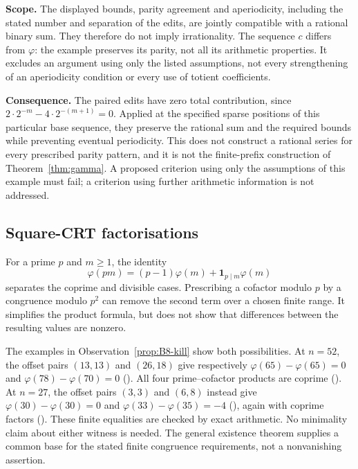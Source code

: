 \textbf{Scope.} The displayed bounds, parity agreement and
aperiodicity, including the stated number and separation of the edits,
are jointly compatible with a rational binary sum. They therefore do not
imply irrationality. The sequence $c$ differs from $\varphi$: the example
preserves its parity, not all its arithmetic properties. It excludes an
argument using only the listed assumptions, not every strengthening of
an aperiodicity condition or every use of totient coefficients.

\textbf{Consequence.} The paired edits have zero total contribution,
since $2\cdot2^{-m}-4\cdot2^{-(m+1)}=0$. Applied at the specified sparse
positions of this particular base sequence, they preserve the rational
sum and the required bounds while preventing eventual periodicity. This
does not construct a rational series for every prescribed parity pattern,
and it is not the finite-prefix construction of Theorem~\ref{thm:gamma}.
A proposed criterion using only the assumptions of this example must fail;
a criterion using further arithmetic information is not addressed.


\subsection{Square-CRT factorisations}

For a prime $p$ and $m\ge1$, the identity
\[
 \varphi(pm)=(p-1)\varphi(m)+\mathbf1_{p\mid m}\varphi(m)
\]
separates the coprime and divisible cases. Prescribing a cofactor
modulo $p$ by a congruence modulo $p^2$ can remove the second term
over a chosen finite range. It simplifies the product formula, but
does not show that differences between the resulting values are nonzero.

The examples in Observation~\ref{prop:B8-kill} show both possibilities.
At $n=52$, the offset pairs $(13,13)$ and $(26,18)$ give respectively
$\varphi(65)-\varphi(65)=0$ and
$\varphi(78)-\varphi(70)=0$
().
All four prime--cofactor products are coprime
().
At $n=27$, the offset pairs $(3,3)$ and $(6,8)$ instead give
$\varphi(30)-\varphi(30)=0$ and
$\varphi(33)-\varphi(35)=-4$
(),
again with coprime factors
().
These finite equalities are checked by exact arithmetic. No minimality
claim about either witness is needed. The general existence theorem
supplies a common base for the stated finite congruence requirements,
not a nonvanishing assertion.

